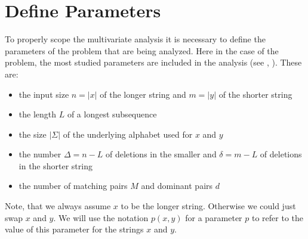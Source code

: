 \section{Define Parameters}
To properly scope the multivariate analysis it is necessary to define the parameters of the problem that are being analyzed.
Here in the case of the \lcs{} problem, the most studied parameters are included in the analysis (see \cite{Bergroth.2000}, \cite{Paterson.1994}). 
These are:
\begin{itemize}
	\item the input size $n = |x|$ of the longer string and $m = |y|$ of the shorter string
	\item the length $L$ of a longest subsequence
	\item the size $|\Sigma|$ of the underlying alphabet used for $x$ and $y$
	\item the number $\Delta = n - L$ of deletions in the smaller and $\delta = m - L$ of deletions in the shorter string
	\item the number of matching pairs $M$ and dominant pairs $d$
\end{itemize}
Note, that we always assume $x$ to be the longer string. Otherwise we could just swap $x$ and $y$.
We will use the notation $p(x,y)$ for a parameter $p$ to refer to the value of this parameter for the strings $x$ and $y$.

